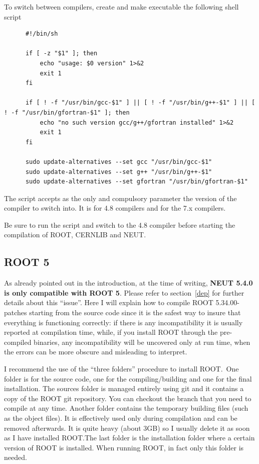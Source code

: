 To switch between compilers, create and make executable the following
shell script
\begin{lstlisting}
      #!/bin/sh

      if [ -z "$1" ]; then
          echo "usage: $0 version" 1>&2
          exit 1
      fi

      if [ ! -f "/usr/bin/gcc-$1" ] || [ ! -f "/usr/bin/g++-$1" ] || [ ! -f "/usr/bin/gfortran-$1" ]; then
          echo "no such version gcc/g++/gfortran installed" 1>&2
          exit 1
      fi

      sudo update-alternatives --set gcc "/usr/bin/gcc-$1"
      sudo update-alternatives --set g++ "/usr/bin/g++-$1"
      sudo update-alternatives --set gfortran "/usr/bin/gfortran-$1"
\end{lstlisting}
The script accepts as the only and compulsory parameter the version of
the compiler to switch into. It is  for 4.8 compilers
and  for the 7.x compilers.

Be sure to run the script and switch to the 4.8 compiler before
starting the compilation of ROOT, CERNLIB and NEUT.\@ 

\subsection{ROOT 5}\label{root5}
As already pointed out in the introduction, at the time of writing,
\textbf{NEUT 5.4.0 is only compatible with ROOT 5}. Please refer to
section~\ref{dep} for further details about this ``issue''.  Here I
will explain how to compile ROOT 5.34.00-patches starting from the
source code since it is the safest way to insure that everything is
functioning correctly: if there is any incompatibility it is usually
reported at compilation time, while, if you install ROOT through the
pre-compiled binaries, any incompatibility will be uncovered only at
run time, when the errors can be more obscure and misleading to
interpret.

I recommend the use of the ``three folders'' procedure to install
ROOT.\ One folder is for the source code, one for the
compiling/building and one for the final installation. The sources
folder is managed entirely using git and it contains a copy of the
ROOT git repository. You can checkout the branch that you need to
compile at any time. Another folder contains the temporary building
files (such as the object files). It is effectively used only during
compilation and can be removed afterwards. It is quite heavy (about
3GB) so I usually delete it as soon as I have installed ROOT.\@ The
last folder is the installation folder where a certain version of ROOT
is installed. When running ROOT, in fact only this folder is needed.

